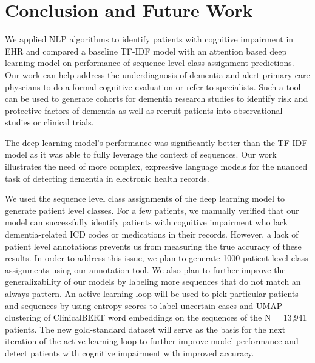 \documentclass[pmlr,twocolumn,10pt]{jmlr} %
\begin{document}
\section{Conclusion and Future Work} 
\label{sec:ConclusionFutureWork} We applied NLP algorithms to identify patients with cognitive impairment in EHR and compared a baseline TF-IDF model with an attention based deep learning model on performance of sequence level class assignment predictions. Our work can help address the underdiagnosis of dementia and alert primary care physcians to do a formal cognitive evaluation or refer to specialists. Such a tool can be used to generate cohorts for dementia research studies to identify risk and protective factors of dementia as well as recruit patients into observational studies or clinical trials. 

The deep learning model's performance was significantly better than the TF-IDF model as it was able to fully leverage the context of sequences. Our work illustrates the need of more complex, expressive language models for the nuanced task of detecting dementia in electronic health records.

We used the sequence level class assignments of the deep learning model to generate patient level classes. For a few patients, we manually verified that our model can successfully identify patients with cognitive impairment who lack dementia-related ICD codes or medications in their records. However, a lack of patient level annotations prevents us from measuring the true accuracy of these results. In order to address this issue, we plan to generate 1000 patient level class assignments using our annotation tool. We also plan to further improve the generalizability of our models by labeling more sequences that do not match an always pattern. An active learning loop will be used to pick particular patients and sequences by using entropy scores to label uncertain cases and UMAP clustering \citep{mcinnes2018umap} of ClinicalBERT word embeddings on the sequences of the N = 13,941 patients. The new gold-standard dataset will serve as the basis for the next iteration of the active learning loop to further improve model performance and detect patients with cognitive impairment with improved accuracy.

\clearpage



\nocite{*}

\clearpage
\end{document}
